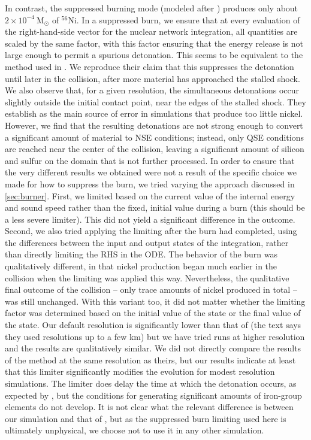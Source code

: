 \documentclass[twocolumn,numberedappendix]{../aastex6}
\newcommand{\msolar}{\mathrm{M}_\odot}
\begin{document}


In contrast, the suppressed burning mode (modeled after \citet{kushnir:2013}) produces only about
$2 \times 10^{-4}\ \msolar$ of $^{56}$Ni. In a suppressed burn, we ensure that at every evaluation
of the right-hand-side vector for the nuclear network integration, all quantities are scaled by the
same factor, with this factor ensuring that the energy release is not large enough to permit a
spurious detonation. This seems to be equivalent to the method used in \citet{kushnir:2013}. We
reproduce their claim that this suppresses the detonation until later in the collision, after more
material has approached the stalled shock. We also observe that, for a given resolution, the simultaneous
detonations occur slightly outside the initial contact point, near the edges of the stalled shock. They
establish as the main source of error in simulations that produce too little nickel. However, we find
that the resulting detonations are not strong enough to convert a significant amount of material to NSE
conditions; instead, only QSE conditions are reached near the center of the collision, leaving a significant
amount of silicon and sulfur on the domain that is not further processed. In order to ensure that the
very different results we obtained were not a result of the specific choice we made for how to suppress
the burn, we tried varying the approach discussed in \autoref{sec:burner}. First, we limited based on
the current value of the internal energy and sound speed rather than the fixed, initial value during a burn
(this should be a less severe limiter). This did not yield a significant difference in the outcome. Second,
we also tried applying the limiting after the burn had completed, using the differences between the input
and output states of the integration, rather than directly limiting the RHS in the ODE. The behavior of the
burn was qualitatively different, in that nickel production began much earlier in the collision when the limiting
was applied this way. Nevertheless, the qualitative final outcome of the collision -- only trace amounts
of nickel produced in total -- was still unchanged. With this variant too, it did not matter whether the limiting
factor was determined based on the initial value of the state or the final value of the state.
Our default resolution is significantly lower than that of \citeauthor{kushnir:2013} (the text
says they used resolutions up to a few km) but we have tried runs at higher resolution and
the results are qualitatively similar. We did not directly compare the results of the method at
the same resolution as theirs, but our results indicate at least that this limiter significantly
modifies the evolution for modest resolution simulations. The limiter does delay the time at which
the detonation occurs, as expected by \citeauthor{kushnir:2013}, but the conditions for generating
significant amounts of iron-group elements do not develop. It is not clear what the relevant difference
is between our simulation and that of \citeauthor{kushnir:2013}, but as the suppressed burn limiting
used here is ultimately unphysical, we choose not to use it in any other simulation.
\end{document}
